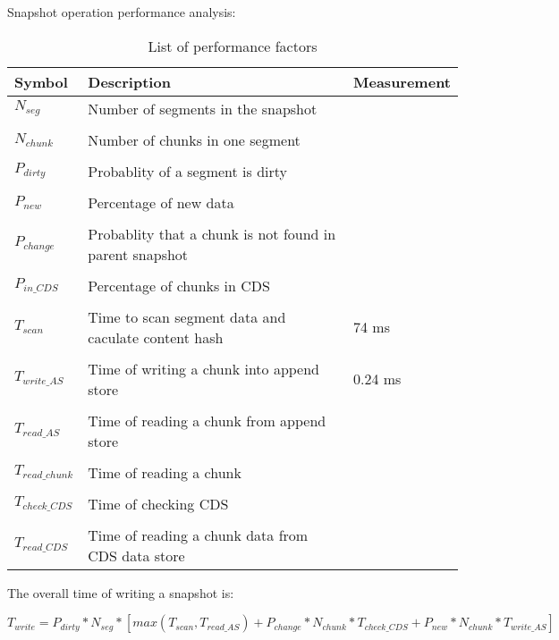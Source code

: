 Snapshot operation performance analysis:
\begin{table}
    \begin{tabular}{l p{1.5in} l}
        \hline
        Symbol & Description & Measurement \\ \hline
        $N_{seg}$ & Number of segments in the snapshot & ~ \\ [1ex] \\ [-1.5ex]
        $N_{chunk}$ & Number of chunks in one segment & ~ \\ [1ex] \\ [-1.5ex]
        $P_{dirty}$ & Probablity of a segment is dirty & ~ \\ [1ex] \\ [-1.5ex]
        $P_{new}$ & Percentage of new data & ~ \\ [1ex] \\ [-1.5ex]
        $P_{change}$ & Probablity that a chunk is not found in parent snapshot & ~ \\ [1ex] \\ [-1.5ex]
        $P_{in\_CDS}$ & Percentage of chunks in CDS & ~ \\ [1ex] \\ [-1.5ex]
        $T_{scan}$ & Time to scan segment data and caculate content hash & 74 ms \\ [1ex] \\ [-1.5ex]
        $T_{write\_AS}$ & Time of writing a chunk into append store & 0.24 ms \\ [1ex] \\ [-1.5ex]
        $T_{read\_AS}$ & Time of reading a chunk from append store & ~ \\ [1ex] \\ [-1.5ex]
        $T_{read\_chunk}$ & Time of reading a chunk & ~ \\ [1ex] \\ [-1.5ex]
        $T_{check\_CDS}$ & Time of checking CDS & ~ \\ [1ex] \\ [-1.5ex]
        $T_{read\_CDS}$ & Time of reading a chunk data from CDS data store& ~ \\
        \hline
    \end{tabular}
    \caption{List of performance factors}
    \label{tab:as_param}
\end{table}

The overall time of writing a snapshot is:

\begin{dmath}
T_{write} = P_{dirty} * N_{seg} * [max(T_{scan}, T_{read\_AS}) + P_{change} * N_{chunk} * T_{check\_CDS} + P_{new} * N_{chunk} * T_{write\_AS}]
\end{dmath}

